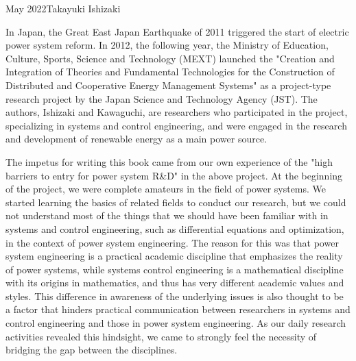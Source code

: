 \begin{preface}{May 2022}{Takayuki Ishizaki}

In Japan, the Great East Japan Earthquake of 2011 triggered the start of electric power system reform.
In 2012, the following year, the Ministry of Education, Culture, Sports, Science and Technology (MEXT) launched the "Creation and Integration of Theories and Fundamental Technologies for the Construction of Distributed and Cooperative Energy Management Systems" as a project-type research project by the Japan Science and Technology Agency (JST).
The authors, Ishizaki and Kawaguchi, are researchers who participated in the project, specializing in systems and control engineering, and were engaged in the research and development of renewable energy as a main power source.

The impetus for writing this book came from our own experience of the "high barriers to entry for power system R\&D" in the above project.
At the beginning of the project, we were complete amateurs in the field of power systems.
We started learning the basics of related fields to conduct our research, but we could not understand most of the things that we should have been familiar with in systems and control engineering, such as differential equations and optimization, in the context of power system engineering.
The reason for this was that power system engineering is a practical academic discipline that emphasizes the reality of power systems, while systems control engineering is a mathematical discipline with its origins in mathematics, and thus has very different academic values and styles.
This difference in awareness of the underlying issues is also thought to be a factor that hinders practical communication between researchers in systems and control engineering and those in power system engineering.
As our daily research activities revealed this hindsight, we came to strongly feel the necessity of bridging the gap between the disciplines.


\end{preface}
